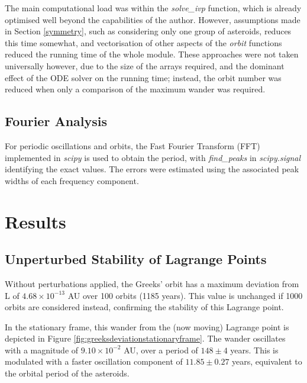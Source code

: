 \documentclass[11pt, a4paper,twocolumn]{article} %
\begin{document}
The main computational load was within the \textit{solve\_ivp} function, which is already optimised well beyond the capabilities of the author. However, assumptions made in Section \ref{symmetry}, such as considering only one group of asteroids, reduces this time somewhat, and vectorisation of other aspects of the \textit{orbit} functions reduced the running time of the whole module. These approaches were not taken universally however, due to the size of the arrays required, and the dominant effect of the ODE solver on the running time; instead, the orbit number was reduced when only a comparison of the maximum wander was required. 

\subsection{Fourier Analysis} \label{Fourier}
For periodic oscillations and orbits, the Fast Fourier Transform (FFT) implemented in \textit{scipy} is used to obtain the period, with \textit{find\_peaks} in \textit{scipy.signal} identifying the exact values. The errors were estimated using the associated peak widths of each frequency component.

\section{Results}
\subsection{Unperturbed Stability of Lagrange Points} \label{unperturbed}
Without perturbations applied, the Greeks' orbit has a maximum deviation from L of $4.68 \times 10^{-13}$ AU over 100 orbits (1185 years). This value is unchanged if 1000 orbits are considered instead, confirming the stability of this Lagrange point.

In the stationary frame, this wander from the (now moving) Lagrange point is depicted in Figure \ref{fig:greeksdeviationstationaryframe}. The wander oscillates with a magnitude of $9.10 \times 10^{-2}$ AU, over a period of $148 \pm 4$ years. This is modulated with a faster oscillation component of $11.85 \pm 0.27$ years, equivalent to the orbital period of the asteroids.
\end{document}
